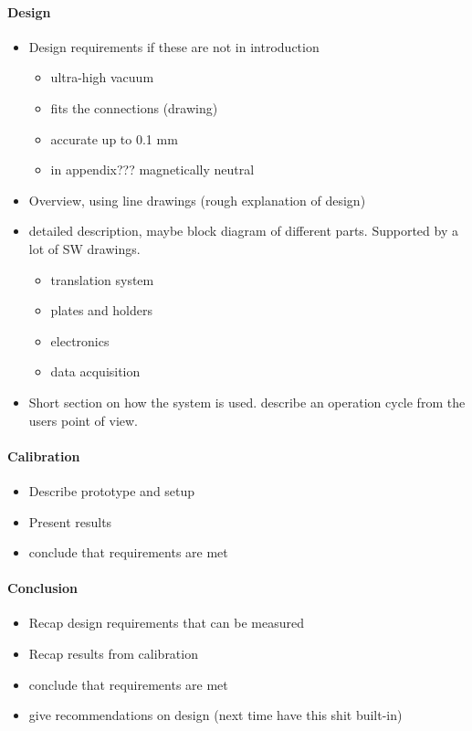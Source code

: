 \paragraph{Design}
\begin{itemize}
 \item Design requirements if these are not in introduction
 \begin{itemize}
  \item ultra-high vacuum
  \item fits the connections (drawing)
  \item accurate up to 0.1 mm
  \item in appendix??? magnetically neutral
 \end{itemize}
 \item Overview, using line drawings (rough explanation of design)
 \item detailed description, maybe block diagram of different parts. Supported by a lot of SW drawings.
 \begin{itemize}
  \item translation system
  \item plates and holders
  \item electronics
  \item data acquisition
 \end{itemize}
 \item Short section on how the system is used. describe an operation cycle from the users point of view.
\end{itemize}

\paragraph{Calibration}
\begin{itemize}
 \item Describe prototype and setup
 \item Present results
 \item conclude that requirements are met
\end{itemize}

\paragraph{Conclusion}
\begin{itemize}
 \item Recap design requirements that can be measured
 \item Recap results from calibration
 \item conclude that requirements are met
 \item give recommendations on design (next time have this shit built-in)
 
\end{itemize}